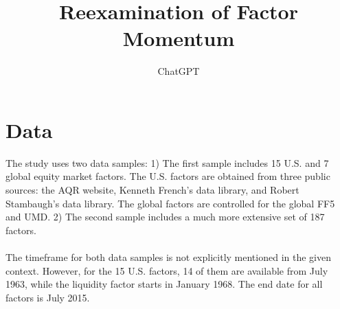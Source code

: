 \documentclass{article}
\title{Reexamination of Factor Momentum}
\author{ChatGPT}
\begin{document}
 

\maketitle
\section{Data}
The study uses two data samples: 
1) The first sample includes 15 U.S. and 7 global equity market factors. The U.S. factors are obtained from three public sources: the AQR website, Kenneth French's data library, and Robert Stambaugh's data library. The global factors are controlled for the global FF5 and UMD.
2) The second sample includes a much more extensive set of 187 factors. \\
\\
The timeframe for both data samples is not explicitly mentioned in the given context. However, for the 15 U.S. factors, 14 of them are available from July 1963, while the liquidity factor starts in January 1968. The end date for all factors is July 2015. 
\end{document}
